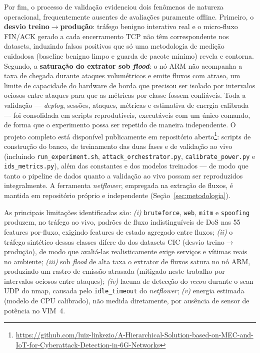 \documentclass[12pt]{article}
\begin{document}
Por fim, o processo de validação evidenciou dois fenômenos de natureza
operacional, frequentemente ausentes de avaliações puramente offline. Primeiro,
o \textbf{desvio treino$\rightarrow$produção}: tráfego benigno interativo real e
o micro-fluxo FIN/ACK gerado a cada encerramento TCP não têm correspondente nos
datasets, induzindo falsos positivos que só uma metodologia de medição cuidadosa
(baseline benigno limpo e guarda de pacote mínimo) revela e contorna. Segundo, a
\textbf{saturação do extrator sob \textit{flood}}: o nó ARM não acompanha a taxa
de chegada durante ataques volumétricos e emite fluxos com atraso, um limite de
capacidade do hardware de borda que precisou ser isolado por intervalos ociosos
entre ataques para que as métricas por classe fossem confiáveis. Toda a
validação — \textit{deploy}, sessões, ataques, métricas e estimativa de energia
calibrada — foi consolidada em scripts reprodutíveis, executáveis com um único
comando, de forma que o experimento possa ser repetido de maneira independente.
O projeto completo está disponível publicamente em repositório
aberto\footnote{\url{https://github.com/luiz-linkezio/A-Hierarchical-Solution-based-on-MEC-and-IoT-for-Cyberattack-Detection-in-6G-Networks}}:
scripts de construção do banco, de treinamento das duas fases e de validação ao
vivo (incluindo \texttt{run\_experiment.sh}, \texttt{attack\_orchestrator.py},
\texttt{calibrate\_power.py} e \texttt{ids\_metrics.py}), além das constantes e
dos modelos treinados — de modo que tanto o pipeline de dados quanto a validação
ao vivo possam ser reproduzidos integralmente. A ferramenta \textit{netflower},
empregada na extração de fluxos, é mantida em repositório próprio e independente
(Seção~\ref{sec:metodologia}).

As principais limitações identificadas são: \textit{(i)} \texttt{bruteforce},
\texttt{web}, \texttt{mitm} e \texttt{spoofing} produzem, no tráfego ao vivo,
padrões de fluxo indistinguíveis de DoS nas 55 features por-fluxo, exigindo
features de estado agregado entre fluxos; \textit{(ii)} o tráfego sintético
dessas classes difere do dos datasets CIC (desvio treino$\rightarrow$produção),
de modo que avaliá-las realisticamente exige serviços e vítimas reais no
ambiente; \textit{(iii)} sob \textit{flood} de alta taxa o extrator de fluxos
satura no nó ARM, produzindo um rastro de emissão atrasada (mitigado neste
trabalho por intervalos ociosos entre ataques); \textit{(iv)} lacuna de detecção
do \textit{recon} durante o scan UDP do nmap, causada pelo \texttt{idle\_timeout}
do \textit{netflower}; \textit{(v)} energia estimada (modelo de CPU calibrado),
não medida diretamente, por ausência de sensor de potência no VIM~4.
\end{document}
